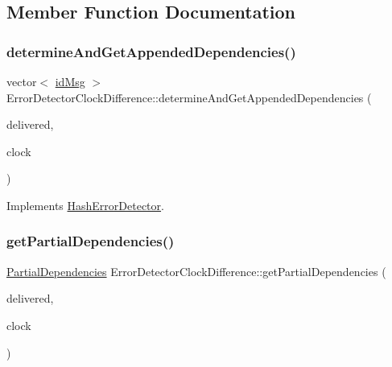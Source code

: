 \subsection{Member Function Documentation}
\mbox{\label{class_error_detector_clock_difference_a15406c8d7652f3b9358b1958d3723933}} 
\subsubsection{\texorpdfstring{determine\+And\+Get\+Appended\+Dependencies()}{determineAndGetAppendedDependencies()}}
{\footnotesize\ttfamily vector$<$ \hyperlink{structures_8h_a83a1d9a070efa5341da84cfd8e28d3e5}{id\+Msg} $>$ Error\+Detector\+Clock\+Difference\+::determine\+And\+Get\+Appended\+Dependencies (\begin{DoxyParamCaption}\item[{const vector$<$ \hyperlink{structures_8h_a7e7bdc1d2fff8a9436f2f352b2711ed6}{message\+Info} $>$ \&}]{delivered,  }\item[{const \hyperlink{class_probabilistic_clock}{Probabilistic\+Clock} \&}]{clock }\end{DoxyParamCaption})\hspace{0.3cm}{\ttfamily [virtual]}}



Implements \hyperlink{class_hash_error_detector_ae45353331e29b50a0aa2fc6dd540ed4e}{Hash\+Error\+Detector}.

\mbox{\label{class_error_detector_clock_difference_a26f4c2905859947201d0a18146f2e961}} 
\subsubsection{\texorpdfstring{get\+Partial\+Dependencies()}{getPartialDependencies()}}
{\footnotesize\ttfamily \hyperlink{class_partial_dependencies}{Partial\+Dependencies} Error\+Detector\+Clock\+Difference\+::get\+Partial\+Dependencies (\begin{DoxyParamCaption}\item[{const vector$<$ \hyperlink{structures_8h_a7e7bdc1d2fff8a9436f2f352b2711ed6}{message\+Info} $>$ \&}]{delivered,  }\item[{const \hyperlink{class_probabilistic_clock}{Probabilistic\+Clock} \&}]{clock }\end{DoxyParamCaption})\hspace{0.3cm}{\ttfamily [virtual]}}



